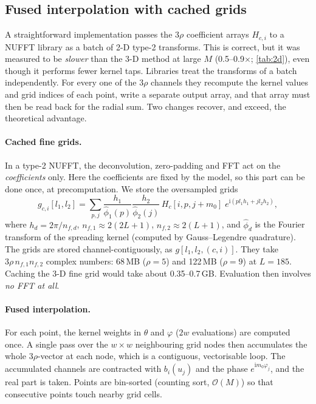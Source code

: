 \documentclass[11pt,a4paper]{article}
\theoremstyle{remark}
\newcommand{\Oh}{\mathcal{O}}
\begin{document}
\subsection{Fused interpolation with cached grids}\label{sec:fused}

A straightforward implementation passes the $3\rho$ coefficient arrays $H_{c,i}$ to a NUFFT library
as a batch of 2-D type-2 transforms. This is correct, but it was measured to be \emph{slower} than the
3-D method at large $M$ (0.5--0.9$\times$; \cref{tab:2d}), even though it performs fewer kernel taps.
Libraries treat the transforms of a batch independently. For every one of the $3\rho$ channels they
recompute the kernel values and grid indices of each point, write a separate output array, and
that array must then be read back for the radial sum. Two changes recover, and exceed, the
theoretical advantage.

\paragraph{Cached fine grids.} In a type-2 NUFFT, the deconvolution, zero-padding and FFT act on the
\emph{coefficients} only. Here the coefficients are fixed by the model, so this part can be done once,
at precomputation. We store the oversampled grids
\begin{equation}
g_{c,i}[l_1,l_2]=\sum_{p,j}\frac{h_1}{\hat\phi_1(p)}\frac{h_2}{\hat\phi_2(j)}\,H_c[i,p,j+m_0]\;e^{\mathrm i(pl_1h_1+jl_2h_2)},
\end{equation}
where $h_d=2\pi/n_{f,d}$, $n_{f,1}\approx2(2L+1)$, $n_{f,2}\approx2(L+1)$, and $\hat\phi_d$ is the Fourier
transform of the spreading kernel (computed by Gauss--Legendre quadrature). The grids are stored
channel-contiguously, as $g[l_1,l_2,(c,i)]$. They take $3\rho\,n_{f,1}n_{f,2}$ complex numbers: 68\,MB
($\rho=5$) and 122\,MB ($\rho=9$) at $L=185$. Caching the 3-D fine grid would take
about 0.35--0.7\,GB. Evaluation then involves \emph{no FFT at all}.

\paragraph{Fused interpolation.} For each point, the kernel weights in $\theta$ and $\varphi$ ($2w$
evaluations) are computed once. A single pass over the $w\times w$ neighbouring grid nodes then
accumulates the whole $3\rho$-vector at each node, which is a contiguous, vectorisable loop. The
accumulated channels are contracted with $b_i(u_j)$ and the phase $e^{\mathrm im_0\varphi_j}$, and the real
part is taken. Points are bin-sorted (counting sort, $\Oh(M)$) so that consecutive points touch
nearby grid cells.
\end{document}
